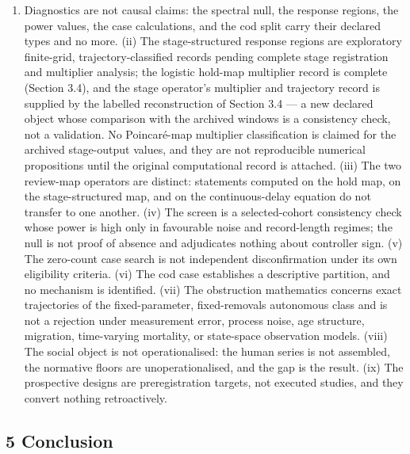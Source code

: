 \documentclass[11pt]{article}
\providecommand{\tightlist}{\setlength{\itemsep}{0pt}\setlength{\parskip}{0pt}}
\begin{document}
\begin{enumerate}
\def\labelenumi{(\roman{enumi})}
\tightlist
\item
  Diagnostics are not causal claims: the spectral null, the response
  regions, the power values, the case calculations, and the cod split
  carry their declared types and no more. (ii) The stage-structured
  response regions are exploratory finite-grid, trajectory-classified
  records pending complete stage registration and multiplier analysis;
  the logistic hold-map multiplier record is complete (Section 3.4), and
  the stage operator's multiplier and trajectory record is supplied by
  the labelled reconstruction of Section 3.4 --- a new declared object
  whose comparison with the archived windows is a consistency check, not
  a validation. No Poincar\'e-map multiplier classification is claimed for
  the archived stage-output values, and they are not reproducible
  numerical propositions until the original computational record is
  attached. (iii) The two review-map operators are distinct: statements
  computed on the hold map, on the stage-structured map, and on the
  continuous-delay equation do not transfer to one another. (iv) The
  screen is a selected-cohort consistency check whose power is high only
  in favourable noise and record-length regimes; the null is not proof
  of absence and adjudicates nothing about controller sign. (v) The
  zero-count case search is not independent disconfirmation under its
  own eligibility criteria. (vi) The cod case establishes a descriptive
  partition, and no mechanism is identified. (vii) The obstruction
  mathematics concerns exact trajectories of the fixed-parameter,
  fixed-removals autonomous class and is not a rejection under
  measurement error, process noise, age structure, migration,
  time-varying mortality, or state-space observation models. (viii) The
  social object is not operationalised: the human series is not
  assembled, the normative floors are unoperationalised, and the gap is
  the result. (ix) The prospective designs are preregistration targets,
  not executed studies, and they convert nothing retroactively.
\end{enumerate}

\subsection{5 Conclusion}\label{conclusion}
\end{document}

